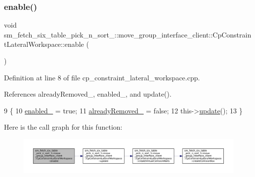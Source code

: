 \subsubsection{\texorpdfstring{enable()}{enable()}}
{\footnotesize\ttfamily void sm\+\_\+fetch\+\_\+six\+\_\+table\+\_\+pick\+\_\+n\+\_\+sort\+\_\+::move\+\_\+group\+\_\+interface\+\_\+client\+::\+Cp\+Constraint\+Lateral\+Workspace\+::enable (\begin{DoxyParamCaption}{ }\end{DoxyParamCaption})}



Definition at line 8 of file cp\+\_\+constraint\+\_\+lateral\+\_\+workspace.\+cpp.



References already\+Removed\+\_\+, enabled\+\_\+, and update().


\begin{DoxyCode}
9         \{
10             \hyperlink{classsm__fetch__six__table__pick__n__sort__1_1_1move__group__interface__client_1_1CpConstraintLateralWorkspace_a1ccb3b3c9fc3456aa3e4e95849ff7ded}{enabled\_} = \textcolor{keyword}{true};
11             \hyperlink{classsm__fetch__six__table__pick__n__sort__1_1_1move__group__interface__client_1_1CpConstraintLateralWorkspace_ad4f581ba97f45a7215d7cbb994d34825}{alreadyRemoved\_} = \textcolor{keyword}{false};
12             this->\hyperlink{classsm__fetch__six__table__pick__n__sort__1_1_1move__group__interface__client_1_1CpConstraintLateralWorkspace_a90a9740b4c6810933cb9f72e49c03a55}{update}();
13         \}
\end{DoxyCode}
Here is the call graph for this function\+:
\nopagebreak
\begin{figure}[H]
\begin{center}
\leavevmode
\includegraphics[width=350pt]{classsm__fetch__six__table__pick__n__sort__1_1_1move__group__interface__client_1_1CpConstraintLateralWorkspace_aabc96f25a0233ec8d1216d88fac2c0b7_cgraph}
\end{center}
\end{figure}
\mbox{\label{classsm__fetch__six__table__pick__n__sort__1_1_1move__group__interface__client_1_1CpConstraintLateralWorkspace_a16eaaab52aaf8c75fcea1064dea28c4b}} 

